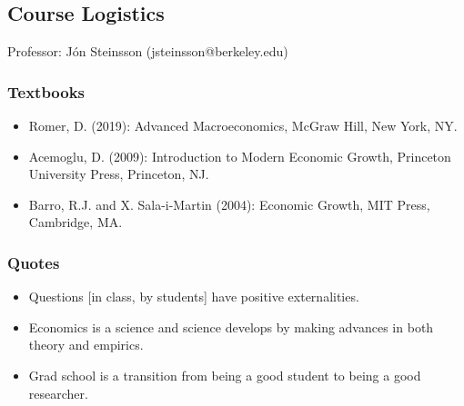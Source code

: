 \documentclass[12pt]{article}
\begin{document}



% 





\subsection*{Course Logistics}
Professor: Jón Steinsson (jsteinsson@berkeley.edu)

\subsubsection*{Textbooks}
\begin{itemize}
    \item Romer, D. (2019): Advanced Macroeconomics, McGraw Hill,
New York, NY.
    \item Acemoglu, D. (2009): Introduction to Modern Economic Growth,
Princeton University Press, Princeton, NJ.
    \item Barro, R.J. and X. Sala-i-Martin (2004): Economic Growth, MIT Press,
Cambridge, MA.
\end{itemize}

\subsubsection*{Quotes}
\begin{itemize}
    \item Questions [in class, by students] have positive externalities.
    \item Economics is a science and science develops by making advances in both theory and empirics.
    \item Grad school is a transition from being a good student to being a good researcher.
\end{itemize}
\end{document}
